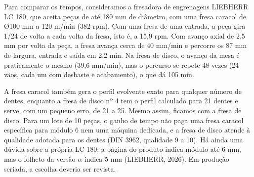 Para comparar os tempos, consideramos a fresadora de engrenagens LIEBHERR LC 180, que aceita peças de até 180 mm de diâmetro, com uma fresa caracol de Ø100 mm a 120 m/min (382 rpm). Com uma fresa de uma entrada, a peça gira 1/24 de volta a cada volta da fresa, isto é, a 15,9 rpm. Com avanço axial de 2,5 mm por volta da peça, a fresa avança cerca de 40 mm/min e percorre os 87 mm de largura, entrada e saída em 2,2 min. Na fresa de disco, o avanço da mesa é praticamente o mesmo (39,6 mm/min), mas o percurso se repete 48 vezes (24 vãos, cada um com desbaste e acabamento), o que dá 105 min.

A fresa caracol também gera o perfil evolvente exato para qualquer número de dentes, enquanto a fresa de disco nº 4 tem o perfil calculado para 21 dentes e serve, com um pequeno erro, de 21 a 25. Mesmo assim, ficamos com a fresa de disco. Para um lote de 10 peças, o ganho de tempo não paga uma fresa caracol específica para módulo 6 nem uma máquina dedicada, e a fresa de disco atende à qualidade adotada para os dentes (DIN 3962, qualidade 9 a 10). Há ainda uma dúvida sobre a própria LC 180: a página do produto indica módulo até 6 mm, mas o folheto da versão $\alpha$ indica 5 mm (LIEBHERR, 2026). Em produção seriada, a escolha deveria ser revista.

